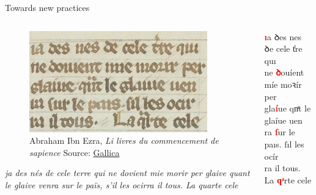 \documentclass[aspectratio=169]{beamer}
\newcommand{\juni}[1]{{\junicodeFont #1}}
\newcommand{\red}[1]{\textcolor{red}{\bf #1}}
\begin{document}

    \begin{frame}{Towards new practices}
        \begin{columns}[t]
            \begin{column}{.52\textwidth}
                    \vspace{-1.5em}
                    \begin{figure}
                        \centering
			            \includegraphics[width=\textwidth,height=0.6\textheight,keepaspectratio]{nlp-for-ch/images/MA_btv1b10465182x_137.jpeg}
                        \caption{\small Abraham Ibn Ezra, \textit{Li livres du commencement de sapience} \tiny{Source: \href{https://gallica.bnf.fr/ark:/12148/btv1b10465182x/f137.item}{Gallica}}}
                        \label{fig:ibnEzra}
                    \end{figure}
                    
                    \vspace{-1em}
                    \textit{ja des nés de cele terre qui ne dovient mie morir per glaive quant le glaive venra sur le païs, s'il les ocirra il tous. La quarte cele}
            \end{column}
            \begin{column}{.48\textwidth}
                \begin{minipage}[t][.48\textheight]{\textwidth}
                    \vspace{.2cm}
                    \red{ı}a \juni{ꝺ}es nes \juni{ꝺ}e cele \juni{t̾}re quı\\ 
                    ne \red{\juni{ꝺ}}ouíent míe mo\juni{ꝛ}ír per\\ 
                    gla\red{í}ue q\juni{nͣ}t le glaíue uen\\ 
                    ra \red{\juni{ſ}}ur le paıs. \juni{ſ}ıl les ocír\\ 
                    ra il tous. La \red{\juni{qͣ}}rte cele
                \end{minipage}\par
                \begin{minipage}[t][.48\textheight]{\textwidth}
             
                \end{minipage}
            \end{column}
        \end{columns}
    \end{frame}
\end{document}
